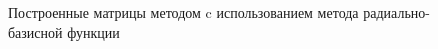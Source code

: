 \begin{figure}[h]
    \begin{minipage}[h]{0.3\linewidth}
    \end{minipage}
    \hfill
    \begin{minipage}[h]{0.3\linewidth}
    \end{minipage}
    \hfill
    \begin{minipage}[h]{0.3\linewidth}
    \end{minipage}
\caption{Построенные матрицы методом c использованием метода радиально-базисной функции}
\label{fig:15}
\end{figure}


